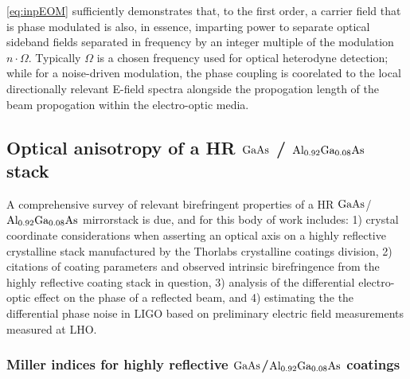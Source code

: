 \ref{eq:inpEOM} sufficiently demonstrates that, to the first order, a carrier field that is phase modulated is also, in essence, imparting power to separate optical sideband fields separated in frequency by an integer multiple of the modulation $n \cdot \Omega$. Typically $\Omega$ is a chosen frequency used for optical heterodyne detection; while for a noise-driven modulation, the phase coupling is coorelated to the local directionally relevant E-field spectra alongside the propogation length of the beam propogation within the electro-optic media.

\subsection{Optical anisotropy of a HR \texorpdfstring{$\mathrm{GaAs}$}{gaas} / \texorpdfstring{$\mathrm{Al_{0.92}Ga_{0.08}As}$}{algaas} stack}
A comprehensive survey of relevant birefringent properties of a HR $\mathrm{GaAs}$/$\mathrm{Al_{0.92}Ga_{0.08}As}$ mirrorstack is due, and for this body of work includes: 1) crystal coordinate considerations when asserting an optical axis on a highly reflective crystalline stack manufactured by the Thorlabs crystalline coatings division, 2) citations of coating parameters and observed intrinsic birefringence from the highly reflective coating stack in question, 3) analysis of the differential electro-optic effect on the phase of a reflected beam, and 4) estimating the the differential phase noise in LIGO based on preliminary electric field measurements measured at LHO.
\subsubsection{Miller indices for highly reflective $\mathrm{GaAs}$/$\mathrm{Al_{0.92}Ga_{0.08}As}$ coatings}


